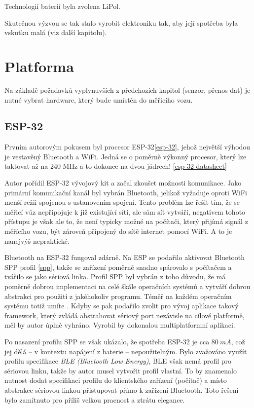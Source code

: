 Technologií baterií byla zvolena LiPol.

Skutečnou výzvou se tak stalo vyrobit elektroniku tak, aby její spotřeba
byla vskutku malá (viz další kapitolu).

\section{Platforma}

Na základě požadavků vyplynuvších z předchozích kapitol (senzor, přenos dat)
je nutné vybrat hardware, který bude umístěn do měřicího vozu.

\subsection{ESP-32}

Prvním autorovým pokusem byl procesor ESP-32\ref{esp-32}, jehož největší
výhodou je vestavěný Bluetooth a WiFi. Jedná se o poměrně výkonný procesor,
který lze taktovat až na 240 MHz a to dokonce na dvou jádrech!
\ref{esp-32-datasheet}

Autor pořídil ESP-32 vývojový kit a začal zkoušet možnosti komunikace. Jako
primární komunikační kanál byl vybrán Bluetooth, jelikož vyžaduje oproti
WiFi menší režii spojenou s ustanovením spojení. Tento problém lze řešit tím,
že se měřicí vůz nepřipojuje k již existující síti, ale sám síť vytváří,
negativem tohoto přístupu je však ale to, že není typicky možné na počítači,
který přijímá signál z měřícího vozu, být zároveň připojený do sítě internet
pomocí WiFi. A to je nanejvýš nepraktické.

Bluetooth na ESP-32 fungoval zdárně. Na ESP se podařilo aktivovat Bluetooth SPP
profil \ref{spp}, takže se zařízení poměrně snadno spárovalo s počítačem a
tvářilo se jako sériová linka. Profil SPP byl vybrán z toho důvodu, že má
poměrně dobrou implementaci na celé škále operačních systémů a vytváří dobrou
abstrakci pro použití z jakéhokoliv programu. Téměř na každém operačním systému
totiž umíte . Kdyby se pak podařilo zvolit pro vývoj
aplikace takový framework, který zvládá abstrahovat sériový port nezávisle na
cílové platformě, měl by autor úplně vyhráno. Vyrobil by dokonalou
multiplatformní aplikaci.

Po nasazení profilu SPP se však ukázalo, že spotřeba ESP-32 je cca $80\ mA$,
což jej dělá -- v kontextu napájení z baterie -- nepoužitelným. Bylo zvažováno
využít profilu specifikace \textit{BLE (Bluetooth Low Energy)}, BLE však nemá
profil pro sériovou linku, takže by autor musel vytvořit profil vlastní. To
by znamenalo nutnost dodat specifikaci profilu do klientského zařízení (počítač)
a místo abstrakce sériovou linkou přistupovat přímo k zařízení Bluetooth.
Toto řešení bylo zamítnuto pro příliš velkou pracnost a ztrátu elegance.

